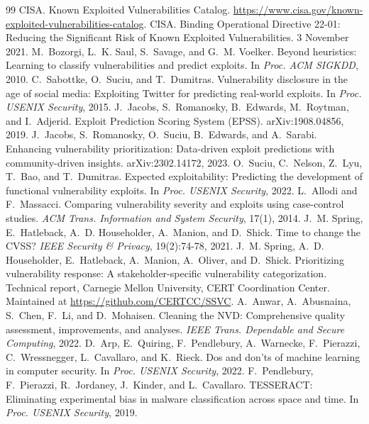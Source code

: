 \documentclass[11pt,a4paper]{article}
\begin{document}
\begin{thebibliography}{99}\small
{} CISA. Known Exploited Vulnerabilities Catalog. \url{https://www.cisa.gov/known-exploited-vulnerabilities-catalog}.
 CISA. Binding Operational Directive 22-01: Reducing the Significant Risk of Known Exploited Vulnerabilities. 3 November 2021.
 M.~Bozorgi, L.~K. Saul, S.~Savage, and G.~M. Voelker. Beyond heuristics: Learning to classify vulnerabilities and predict exploits. In \emph{Proc. ACM SIGKDD}, 2010.
 C.~Sabottke, O.~Suciu, and T.~Dumitras. Vulnerability disclosure in the age of social media: Exploiting Twitter for predicting real-world exploits. In \emph{Proc. USENIX Security}, 2015.
 J.~Jacobs, S.~Romanosky, B.~Edwards, M.~Roytman, and I.~Adjerid. Exploit Prediction Scoring System (EPSS). arXiv:1908.04856, 2019.
 J.~Jacobs, S.~Romanosky, O.~Suciu, B.~Edwards, and A.~Sarabi. Enhancing vulnerability prioritization: Data-driven exploit predictions with community-driven insights. arXiv:2302.14172, 2023.
 O.~Suciu, C.~Nelson, Z.~Lyu, T.~Bao, and T.~Dumitras. Expected exploitability: Predicting the development of functional vulnerability exploits. In \emph{Proc. USENIX Security}, 2022.
 L.~Allodi and F.~Massacci. Comparing vulnerability severity and exploits using case-control studies. \emph{ACM Trans. Information and System Security}, 17(1), 2014.
 J.~M. Spring, E.~Hatleback, A.~D. Householder, A.~Manion, and D.~Shick. Time to change the CVSS? \emph{IEEE Security \& Privacy}, 19(2):74-78, 2021.
 J.~M. Spring, A.~D. Householder, E.~Hatleback, A.~Manion, A.~Oliver, and D.~Shick. Prioritizing vulnerability response: A stakeholder-specific vulnerability categorization. Technical report, Carnegie Mellon University, CERT Coordination Center. Maintained at \url{https://github.com/CERTCC/SSVC}.
 A.~Anwar, A.~Abusnaina, S.~Chen, F.~Li, and D.~Mohaisen. Cleaning the NVD: Comprehensive quality assessment, improvements, and analyses. \emph{IEEE Trans. Dependable and Secure Computing}, 2022.
 D.~Arp, E.~Quiring, F.~Pendlebury, A.~Warnecke, F.~Pierazzi, C.~Wressnegger, L.~Cavallaro, and K.~Rieck. Dos and don'ts of machine learning in computer security. In \emph{Proc. USENIX Security}, 2022.
 F.~Pendlebury, F.~Pierazzi, R.~Jordaney, J.~Kinder, and L.~Cavallaro. TESSERACT: Eliminating experimental bias in malware classification across space and time. In \emph{Proc. USENIX Security}, 2019.

\end{thebibliography}
\end{document}
